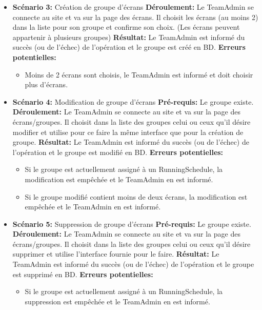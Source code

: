 \documentclass[french]{article}
\begin{document}
\begin{itemize}
		\item \textbf{Scénario 3:} Création de groupe d'écrans\newline
			\textbf{Déroulement:} Le TeamAdmin se connecte au site et va sur la page des écrans. Il choisit les écrans (au moins 2) dans la liste pour son groupe et confirme son choix. (Les écrans peuvent appartenir à plusieurs groupes) \newline
			\textbf{Résultat:} Le TeamAdmin est informé du succès (ou de l'échec) de l'opération et le groupe est créé en BD.\newline	
			\textbf{Erreurs potentielles:} 
			\begin{itemize}
				\item Moins de 2 écrans sont choisis, le TeamAdmin est informé et doit choisir plus d'écrans.\newline
			\end{itemize}
			
		\item \textbf{Scénario 4:} Modification de groupe d'écrans\newline
			\textbf{Pré-requis:} Le groupe existe.\newline
			\textbf{Déroulement:} Le TeamAdmin se connecte au site et va sur la page des écrans/groupes. Il choisit dans la liste des groupes celui ou ceux qu'il désire modifier et utilise pour ce faire la même interface que pour la création de groupe. \newline
			\textbf{Résultat:} Le TeamAdmin est informé du succès (ou de l'échec) de l'opération et le groupe est modifié en BD.\newline	
			\textbf{Erreurs potentielles:} 
			\begin{itemize}
				\item Si le groupe est actuellement assigné à un RunningSchedule, la modification est empêchée et le TeamAdmin en est informé.
				\item Si le groupe modifié contient moins de deux écrans, la modification est empêchée et le TeamAdmin en est informé.\newline
			\end{itemize}
			
		\item \textbf{Scénario 5:} Suppression de groupe d'écrans\newline
			\textbf{Pré-requis:} Le groupe existe.\newline
			\textbf{Déroulement:} Le TeamAdmin se connecte au site et va sur la page des écrans/groupes. Il choisit dans la liste des groupes celui ou ceux qu'il désire supprimer et utilise l'interface fournie pour le faire. \newline
			\textbf{Résultat:} Le TeamAdmin est informé du succès (ou de l'échec) de l'opération et le groupe est supprimé en BD.\newline	
			\textbf{Erreurs potentielles:} 
			\begin{itemize}
				\item Si le groupe est actuellement assigné à un RunningSchedule, la suppression est empêchée et le TeamAdmin en est informé.\newline
			\end{itemize}
		

\end{itemize}
\end{document}
